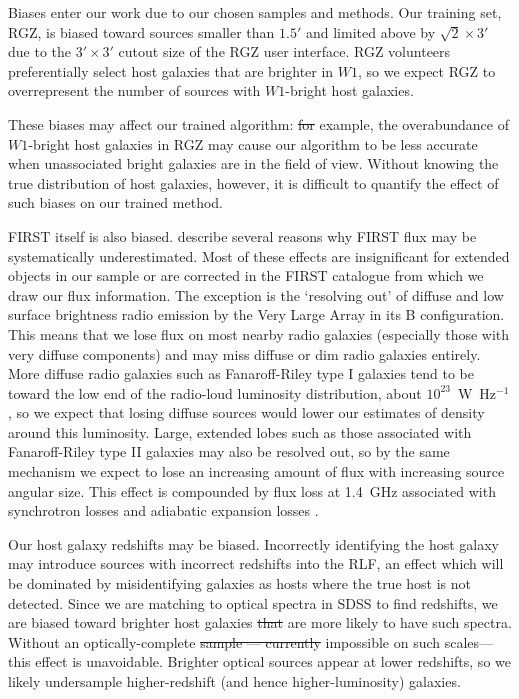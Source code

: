 \documentclass[11pt, a4paper]{book}
\providecommand{\DIFaddtex}[1]{{\protect\color{blue}\uwave{#1}}} %
\providecommand{\DIFdeltex}[1]{{\protect\color{red}\sout{#1}}}                      %
\providecommand{\DIFaddbegin}{} %
\providecommand{\DIFaddend}{} %
\providecommand{\DIFdelbegin}{} %
\providecommand{\DIFdelend}{} %
\providecommand{\DIFadd}[1]{\texorpdfstring{\DIFaddtex{#1}}{#1}} %
\providecommand{\DIFdel}[1]{\texorpdfstring{\DIFdeltex{#1}}{}} %
\newcommand{\DIFscaledelfig}{0.5}
\newlength{\DIFdelgraphicswidth} %
\newlength{\DIFdelgraphicsheight} %
\newcommand{\DIFaddincludegraphics}[2][]{{\color{blue}\fbox{\DIFOincludegraphics[#1]{#2}}}} %
\newcommand{\DIFdelincludegraphics}[2][]{%
\sbox{\DIFdelgraphicsbox}{\DIFOincludegraphics[#1]{#2}}%
\settoboxwidth{\DIFdelgraphicswidth}{\DIFdelgraphicsbox} %
\settoboxtotalheight{\DIFdelgraphicsheight}{\DIFdelgraphicsbox} %
\scalebox{\DIFscaledelfig}{%
\parbox[b]{\DIFdelgraphicswidth}{\usebox{\DIFdelgraphicsbox}\\[-\baselineskip] \rule{\DIFdelgraphicswidth}{0em}}\llap{\resizebox{\DIFdelgraphicswidth}{\DIFdelgraphicsheight}{%
\setlength{\unitlength}{\DIFdelgraphicswidth}%
\begin{picture}(1,1)%
\thicklines\linethickness{2pt} %
{\color[rgb]{1,0,0}\put(0,0){\framebox(1,1){}}}%
{\color[rgb]{1,0,0}\put(0,0){\line( 1,1){1}}}%
{\color[rgb]{1,0,0}\put(0,1){\line(1,-1){1}}}%
\end{picture}%
}\hspace*{3pt}}} %
} %
\DeclareRobustCommand{\DIFaddbegin}{\DIFOaddbegin \let\includegraphics\DIFaddincludegraphics} %
\DeclareRobustCommand{\DIFaddend}{\DIFOaddend \let\includegraphics\DIFOincludegraphics} %
\DeclareRobustCommand{\DIFdelbegin}{\DIFOdelbegin \let\includegraphics\DIFdelincludegraphics} %
\DeclareRobustCommand{\DIFdelend}{\DIFOaddend \let\includegraphics\DIFOincludegraphics} %
\begin{document}
    Biases enter our work due to our chosen samples and methods. Our training set,
    RGZ, is biased toward sources smaller than $1.5'$ and limited above by $\sqrt{2}
    \times 3'$ due to the $3' \times 3'$ cutout size of the RGZ user
    interface. RGZ volunteers preferentially select host
    galaxies that are brighter in $W1$, so we expect RGZ to overrepresent
    the number of sources with $W1$-bright host galaxies.

    These biases may affect our
    trained algorithm: \DIFdelbegin \DIFdel{for }\DIFdelend \DIFaddbegin \DIFadd{For }\DIFaddend example, the overabundance of $W1$-bright host
    galaxies in RGZ may cause our algorithm to be less accurate when
    unassociated bright galaxies are in the field of view. Without knowing the true
    distribution of host galaxies, however, it is difficult to quantify the
    effect of such biases on our trained method.

    FIRST itself is also biased. \citet{helfand15first} describe several reasons why FIRST flux may be systematically underestimated. Most of these effects are insignificant for extended objects in our sample or are corrected in the FIRST catalogue from which we draw our flux information. The exception is the `resolving out' of diffuse and low surface brightness radio emission by the Very Large Array in its B configuration. This means that we lose flux on most nearby radio galaxies (especially those with very
    diffuse components) and may miss diffuse or dim radio galaxies entirely.
    More diffuse radio galaxies such as Fanaroff-Riley type I \citep[FRI;][]{fanaroff1974} galaxies tend to
    be toward the low end of the radio-loud luminosity distribution, about
    $10^{23}$~W~Hz$^{-1}$ \citep{best09radio}, so we expect that losing
    diffuse sources would lower our estimates of density around this
    luminosity. Large, extended lobes such as those associated with Fanaroff-Riley type II \citep[FRII;][]{fanaroff1974} galaxies may also be resolved out, so by the same mechanism we expect to lose an increasing amount of flux with increasing source angular size. This effect is compounded by flux loss at 1.4~GHz associated with synchrotron losses and adiabatic expansion losses \citep{blundell99doubles}.

    Our host galaxy redshifts may be biased. Incorrectly identifying the host galaxy may introduce sources with incorrect redshifts into the RLF, an effect which will be dominated by misidentifying galaxies as hosts where the true host is not detected. Since we are matching to optical spectra in SDSS to find
    redshifts, we are biased toward brighter host galaxies \DIFdelbegin \DIFdel{that }\DIFdelend \DIFaddbegin \DIFadd{which }\DIFaddend are more
    likely to have such spectra. Without an optically-complete \DIFdelbegin \DIFdel{sample ---
    currently }\DIFdelend \DIFaddbegin \DIFadd{sample---currently }\DIFaddend impossible on such scales---this effect is unavoidable.
    Brighter optical sources appear at lower redshifts, so we likely
    undersample higher-redshift (and hence higher-luminosity) galaxies.
\end{document}
